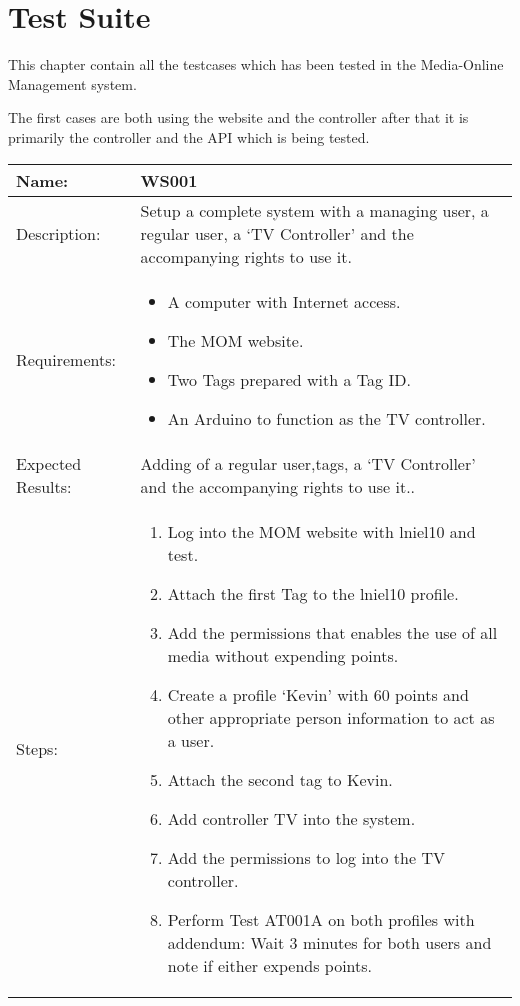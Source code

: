 \chapter{Test Suite}
\label{appen:testSuite}
This chapter contain all the testcases which has been tested in the Media-Online Management system.

The first cases are both using the website and the controller after that it is primarily the controller and the API which is being tested.
\begin{table}[h]
	\centering
		\begin{tabular*}{\textwidth}{|l|l|}
		\hline
		\hline
		Name: & WS001\\
		\hline
		Description: & \parbox{0.70\textwidth}{Setup a complete system with a managing user, a regular user, a `TV Controller' and the accompanying rights to use it.}\\
		\hline
		Requirements: & \parbox{0.70\textwidth}{
		\begin{itemize}
			\item A computer with Internet access.
			\item The MOM website.
			\item Two Tags prepared with a Tag ID.
			\item An Arduino to function as the TV controller. 
		\end{itemize}}
		\\
		\hline
		Expected Results: & \parbox{.70\textwidth}{Adding of a regular user,tags, a `TV Controller' and the accompanying rights to use it..}\\
		\hline
		Steps: & \parbox{.70\textwidth}{
		\begin{enumerate}
			\item Log into the MOM website with lniel10 and test.
			\item Attach the first Tag to the lniel10 profile.
			\item Add the permissions that enables the use of all media without expending points.
			\item Create a profile `Kevin' with 60 points and other appropriate person information to act as a user.
			\item Attach the second tag to Kevin.
			\item Add controller TV into the system.
			\item Add the permissions to log into the TV controller.
			\item Perform Test AT001A on both profiles with addendum: Wait 3 minutes for both users and note if either expends points.

\end{enumerate}}
\end{tabular*}
\end{table}
